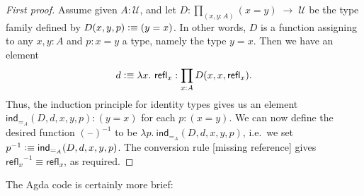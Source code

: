 \documentclass[11pt, a4paper]{article}
\newtheorem{proof}{Proof}
\newcommand{\jdeq}{\equiv}      %
\newcommand{\refl}[1]{\ensuremath{\mathsf{refl}_{#1}}\xspace}
\newcommand{\defeq}{\vcentcolon\equiv}  %
\newcommand{\ind}[1]{\mathsf{ind}_{#1}}
\newcommand{\indid}[1]{\ind{=_{#1}}} %
\newcommand{\blank}{\mathord{\hspace{1pt}\text{--}\hspace{1pt}}}
\newcommand{\opp}[1]{\mathord{{#1}^{-1}}}
\newcommand{\UU}{\ensuremath{\mathcal{U}}\xspace}
\let\type\UU
\begin{document}
\begin{proof}[First proof]
  Assume given $A:\UU$, and
  let $D:{\textstyle\prod_{(x,y:A)}}(x= y) \; \to \; \type$ be the type family defined by $D(x,y,p)\defeq (y= x)$.
  In other words, $D$ is a function assigning to any $x,y:A$ and $p:x=y$ a type, namely the type $y=x$.
  Then we have an element
  \begin{equation*}
    d\defeq \lambda x.\ \refl{x}:\prod_{x:A} D(x,x,\refl{x}).
  \end{equation*}
  Thus, the induction principle for identity types gives us an element
  $\indid{A}(D,d,x,y,p): (y= x)$
  for each $p:(x= y)$.
  We can now define the desired function $\opp{(\blank)}$ to be 
  $\lambda p.\ \indid{A}(D,d,x,y,p)$, 
  i.e.\ we set 
  $\opp{p} \defeq \indid{A}(D,d,x,y,p)$.
  The conversion rule [missing reference] %
  gives $\opp{\refl{x}}\jdeq \refl{x}$, as required.
\end{proof}
The Agda code is certainly more brief: 
\end{document}
